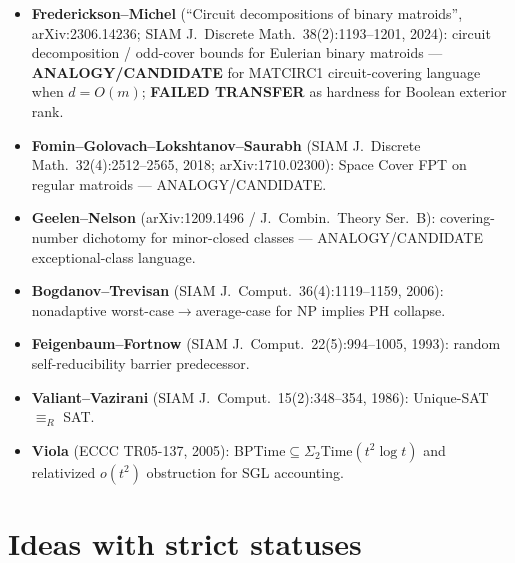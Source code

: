\documentclass[11pt]{article}
\begin{document}
\begin{itemize}
the homogeneous coordinate ring of a \emph{shortened} dual alternant/Goppa code, via
Eagon--Northcott complexes and generalized Macaulay matrices --- first McEliece
structural analysis breaking the exponential barrier in the CPA model.
\textbf{ANALOGY/CANDIDATE} for PQ Hilbert/syzygy/Betti toolkit item and for
higher-than-Schur-square diagnostics on legal-slice / exterior generators;
\textbf{FAILED TRANSFER} as a theorem about binary SU/Hadamard exterior growth (wrong
model: alternant/Goppa duals over extension fields vs.\ declared binary LDE/Hadamard
realizations; cryptographic indistinguishability $\neq$ SAME\_REALIZATION runtime).
\item \textbf{Frederickson--Michel} (``Circuit decompositions of binary matroids'',
arXiv:2306.14236; SIAM J.\ Discrete Math.\ 38(2):1193--1201, 2024): circuit
decomposition / odd-cover bounds for Eulerian binary matroids ---
\textbf{ANALOGY/CANDIDATE} for MATCIRC1 circuit-covering language when $d=O(m)$;
\textbf{FAILED TRANSFER} as hardness for Boolean exterior rank.
\item \textbf{Fomin--Golovach--Lokshtanov--Saurabh} (SIAM J.\ Discrete Math.\ 32(4):2512--2565,
2018; arXiv:1710.02300): Space Cover FPT on regular matroids --- ANALOGY/CANDIDATE.
\item \textbf{Geelen--Nelson} (arXiv:1209.1496 / J.\ Combin.\ Theory Ser.\ B): covering-number
dichotomy for minor-closed classes --- ANALOGY/CANDIDATE exceptional-class language.
\item \textbf{Bogdanov--Trevisan} (SIAM J.\ Comput.\ 36(4):1119--1159, 2006): nonadaptive
worst-case$\to$average-case for NP implies PH collapse.
\item \textbf{Feigenbaum--Fortnow} (SIAM J.\ Comput.\ 22(5):994--1005, 1993): random
self-reducibility barrier predecessor.
\item \textbf{Valiant--Vazirani} (SIAM J.\ Comput.\ 15(2):348--354, 1986): Unique-SAT $\equiv_R$ SAT.
\item \textbf{Viola} (ECCC TR05-137, 2005): BPTime$\subseteq\Sigma_2$Time$(t^2\log t)$ and
relativized $o(t^2)$ obstruction for SGL accounting.
\end{itemize}

\section*{Ideas with strict statuses}
\end{document}
